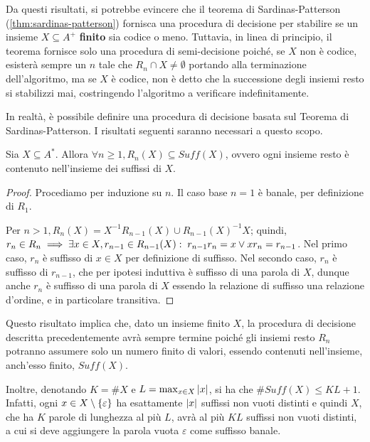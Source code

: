 Da questi risultati, si potrebbe evincere che il teorema di Sardinas-Patterson (\ref{thm:sardinas-patterson}) fornisca una procedura di decisione per stabilire se un insieme \(X \subseteq A^+\) \textbf{finito} sia codice o meno.
Tuttavia, in linea di principio, il teorema fornisce solo una procedura di semi-decisione poiché, se \(X\) non è codice, esisterà sempre un \(n\) tale che \(R_n \cap X \neq \emptyset\) portando alla terminazione dell'algoritmo, ma se \(X\) è codice, non è detto che la successione degli insiemi resto si stabilizzi mai, costringendo l'algoritmo a verificare indefinitamente.

In realtà, è possibile definire una procedura di decisione basata sul Teorema di Sardinas-Patterson.
I risultati seguenti saranno necessari a questo scopo.
\begin{proposition}\label{prop:rest_sets_subset_suffix}
  Sia \(X \subseteq A^*\). Allora \(\forall n \geq 1, R_n(X) \subseteq Suff(X)\), ovvero ogni insieme resto è contenuto nell'insieme dei suffissi di \(X\).
\end{proposition}
\begin{proof}
  Procediamo per induzione su \(n\).
  Il caso base \(n=1\) è banale, per definizione di \(R_1\).

  Per \(n>1, R_n(X)=X^{-1}R_{n-1}(X) \cup {R_{n-1}(X)}^{-1}X\); quindi, \(r_n \in R_n \implies \exists x \in X, r_{n-1}\in R_{n-1}(X) :\; r_{n-1}r_n = x \lor xr_n = r_{n-1}\).
  Nel primo caso, \(r_n\) è suffisso di \(x \in X\) per definizione di suffisso.
  Nel secondo caso, \(r_{n}\) è suffisso di \(r_{n-1}\), che per ipotesi induttiva è suffisso di una parola di \(X\), dunque anche \(r_n\) è suffisso di una parola di \(X\) essendo la relazione di suffisso una relazione d'ordine, e in particolare transitiva.
\end{proof}

Questo risultato implica che, dato un insieme finito \(X\), la procedura di decisione descritta precedentemente avrà sempre termine poiché gli insiemi resto \(R_n\) potranno assumere solo un numero finito di valori, essendo contenuti nell'insieme, anch'esso finito, \(Suff(X)\).

Inoltre, denotando \(K = \# X\) e \(L = \max_{x \in X} \left|x\right|\), si ha che \(\# Suff(X) \leq KL+1\).
Infatti, ogni \( x \in X \setminus \set{\varepsilon}\) ha esattamente \(\left|x\right|\) suffissi non vuoti distinti e quindi \(X\), che ha \(K\) parole di lunghezza al più \(L\), avrà al più \(KL\) suffissi non vuoti distinti, a cui si deve aggiungere la parola vuota \(\varepsilon\) come suffisso banale.

